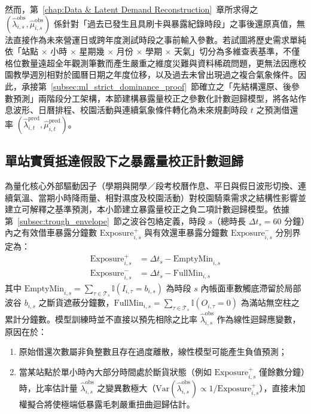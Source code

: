 然而，第~\ref{chap:Data & Latent Demand Reconstruction}~章所求得之 $\left(\hat{\lambda}^{\text{obs}}_{i,s}, \hat{\mu}^{\text{obs}}_{i,s}\right)$ 係針對「過去已發生且具刷卡與暴露紀錄時段」之事後還原真值，無法直接作為未來營運日或跨年度測試時段之事前輸入參數。若試圖將歷史需求單純依「站點 $\times$ 小時 $\times$ 星期幾 $\times$ 月份 $\times$ 學期 $\times$ 天氣」切分為多維查表基準，不僅格位數量遠超全年觀測筆數而產生嚴重之維度災難與資料稀疏問題，更無法因應校園教學週別相對於國曆日期之年度位移，以及過去未曾出現過之複合氣象條件。因此，承接第~\ref{subsec:ml_strict_dominance_proof}~節確立之「先結構還原、後參數預測」兩階段分工架構，本節建構暴露量校正之參數化計數迴歸模型，將各站作息波形、日曆排程、校園活動與連續氣象條件轉化為未來規劃時段 $t$ 之預測借還率 $\left(\hat{\lambda}^{\text{pred}}_{i,t}, \hat{\mu}^{\text{pred}}_{i,t}\right)$。

\subsection{單站實質抵達假設下之暴露量校正計數迴歸}\label{subsec:nb_demand_regression}

為量化核心外部驅動因子（學期與開學／段考校曆作息、平日與假日波形切換、連續氣溫、當期小時降雨量、相對濕度及校園活動）對校園騎乘需求之結構性影響並建立可解釋之基準預測，本小節建立暴露量校正之負二項計數迴歸模型。依據第~\ref{subsec:trough_envelope}~節之波谷包絡定義，時段 $s$（總時長 $\Delta t_s = 60$ 分鐘）內之有效借車暴露分鐘數 $\text{Exposure}^+_{i,s}$ 與有效還車暴露分鐘數 $\text{Exposure}^-_{i,s}$ 分別界定為：
\begin{align}
\text{Exposure}^+_{i,s} &= \Delta t_s - \text{EmptyMin}_{i,s} \\
\text{Exposure}^-_{i,s} &= \Delta t_s - \text{FullMin}_{i,s}
\end{align}
其中 $\text{EmptyMin}_{i,s} = \sum_{\tau \in \mathcal{T}_s} \mathbb{I}(I_{i,\tau} = b_{i,s})$ 為時段 $s$ 內帳面車數觸底滯留於局部波谷 $b_{i,s}$ 之斷貨遮蔽分鐘數，$\text{FullMin}_{i,s} = \sum_{\tau \in \mathcal{T}_s} \mathbb{I}(O_{i,\tau} = 0)$ 為滿站無空柱之累計分鐘數。模型訓練時並不直接以預先相除之比率 $\hat{\lambda}^{\text{obs}}_{i,s}$ 作為線性迴歸應變數，原因在於：
\begin{enumerate}
    \item 原始借還次數屬非負整數且存在過度離散，線性模型可能產生負值預測；
    \item 當某站點於單小時內大部分時間處於斷貨狀態（例如 $\text{Exposure}^+_{i,s}$ 僅餘數分鐘）時，比率估計量 $\hat{\lambda}^{\text{obs}}_{i,s}$ 之變異數極大（$\text{Var}(\hat{\lambda}^{\text{obs}}_{i,s}) \propto 1/\text{Exposure}^+_{i,s}$），直接未加權擬合將使極端低暴露毛刺嚴重扭曲迴歸估計。
\end{enumerate}

